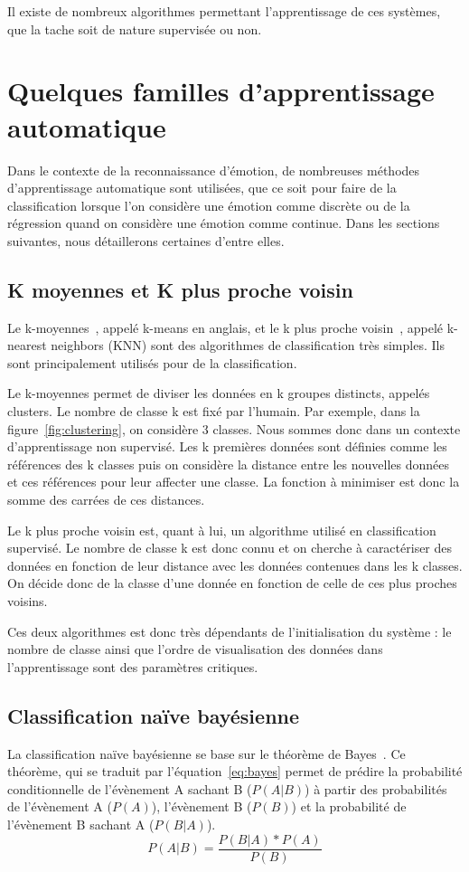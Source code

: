 Il existe de nombreux algorithmes permettant l'apprentissage de ces systèmes, que la tache soit de nature supervisée ou non.

\section{Quelques familles d'apprentissage automatique}
Dans le contexte de la reconnaissance d'émotion, de nombreuses méthodes d'apprentissage automatique sont utilisées, que ce soit pour faire de la classification lorsque l'on considère une émotion comme discrète ou de la régression quand on considère une émotion comme continue.
Dans les sections suivantes, nous détaillerons certaines d'entre elles.

\subsection{K moyennes et K plus proche voisin}
Le k-moyennes~\cite{Lloyd1982}, appelé k-means en anglais, et le k plus proche voisin~\cite{Fix1951,Cover1967}, appelé k-nearest neighbors (KNN) sont des algorithmes de classification très simples. Ils sont principalement utilisés pour de la classification.


Le k-moyennes permet de diviser les données en k groupes distincts, appelés clusters. Le nombre de classe k est fixé par l'humain. Par exemple, dans la figure~\ref{fig:clustering}, on considère 3 classes. Nous sommes donc dans un contexte d'apprentissage non supervisé.
Les k premières données sont définies comme les références des k classes puis on considère la distance entre les nouvelles données et ces références pour leur affecter une classe. La fonction à minimiser est donc la somme des carrées de ces distances.

Le k plus proche voisin est, quant à lui, un algorithme utilisé en classification supervisé. Le nombre de classe k est donc connu et on cherche à caractériser des données en fonction de leur distance avec les données contenues dans les k classes. On décide donc de la classe d'une donnée en fonction de celle de ces plus proches voisins.

Ces deux algorithmes est donc très dépendants de l'initialisation du système : le nombre de classe ainsi que l'ordre de visualisation des données dans l'apprentissage sont des paramètres critiques.


\subsection{Classification naïve bayésienne}
La classification naïve bayésienne se base sur le théorème de Bayes~\cite{Bayes1763}. Ce théorème, qui se traduit par l'équation~\ref{eq:bayes} permet de prédire la probabilité conditionnelle de l'évènement A sachant B ($P(A|B)$) à partir des probabilités de l'évènement A ($P(A)$), l'évènement B ($P(B)$) et la probabilité de l'évènement B sachant A ($P(B|A)$).
\begin{equation}
    P(A|B) = \dfrac{P(B|A)*P(A)}{P(B)}
    \label{eq:bayes}
\end{equation}

